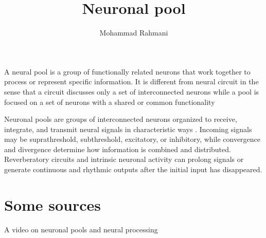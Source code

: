 \documentclass[a4paper]{article}
\title{Neuronal pool}
\date{}
\author{Mohammad Rahmani}
\begin{document}
   \maketitle
   A neural pool is a group of functionally related neurons that work together to process or represent specific information. It is different from neural circuit in the sense that a circuit discusses only a set of interconnected neurons while a pool is focused on a set of neurons with a shared or common functionality


   Neuronal pools are groups of interconnected neurons organized to receive, integrate, and transmit neural signals in characteristic ways \cite{brainkart-2017-transmission-and-processing-of-signals-in-neuronal-pools}. Incoming signals may be suprathreshold, subthreshold, excitatory, or inhibitory, while convergence and divergence determine how information is combined and distributed.
   Reverberatory circuits and intrinsic neuronal activity can prolong signals or generate continuous and rhythmic outputs after the initial input has disappeared.

   \section{Some sources}

      A video on neuronal pools and neural processing
      
      
\end{document}
